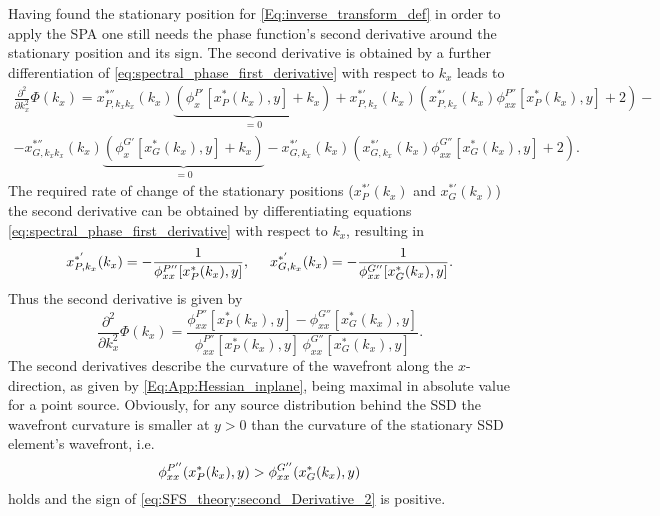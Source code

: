 Having found the stationary position for \eqref{Eq:inverse_transform_def} in order to apply the SPA one still needs the phase function's second derivative around the stationary position and its sign.
The second derivative is obtained by a further differentiation of \eqref{eq:spectral_phase_first_derivative} with respect to $k_x$ leads to
\begin{multline}
\frac{\partial^2}{\partial k_x^2}\Phi(k_x) = 
  x^{*''}_{P,k_x k_x}(k_x) \underbrace{ \left( \phi^{P'}_x[x^*_P(k_x),y]  + k_x \right)}_{ = 0} + 
  x^{*'}_{P,k_x}(k_x) \left( x^{*'}_{P,k_x}(k_x) \phi^{P''}_{xx}[x^*_P(k_x),y]  +2  \right)  -\\
- x^{*''}_{G,k_x k_x}(k_x) \underbrace{ \left( \phi^{G'}_x[x^*_G(k_x),y]  + k_x \right) }_{ = 0} 
- x^{*'}_{G,k_x}(k_x) \left( x^{*'}_{G,k_x}(k_x)  \phi^{G''}_{xx}[x^*_G(k_x),y]  + 2\right).
\end{multline}
The required rate of change of the stationary positions ($x^{*'}_P(k_x)$ and $x^{*'}_G(k_x)$) the second derivative can be obtained by differentiating equations \eqref{eq:spectral_phase_first_derivative} with respect to $k_x$, resulting in
\begin{equation}
x^{*'}_{P,k_x}(k_x) = -\frac{1}{\phi^{P''}_{xx}[x^*_P(k_x),y]}, \hspace{5mm} x^{*'}_{G,k_x}(k_x) = -\frac{1}{\phi^{G''}_{xx}[x^*_G(k_x),y]}.
\end{equation}
Thus the second derivative is given by
\begin{equation}
\label{eq:SFS_theory:second_Derivative_2}
\frac{\partial^2}{\partial k_x^2}\Phi(k_x) = 
\frac{\phi^{P''}_{xx}[x^*_P(k_x),y] - \phi^{G''}_{xx}[x^*_G(k_x),y]}{\phi^{P''}_{xx}[x^*_P(k_x),y] \, \phi^{G''}_{xx}[x^*_G(k_x),y]}.
\end{equation}
The second derivatives describe the curvature of the wavefront along the $x$-direction, as given by \eqref{Eq:App:Hessian_inplane}, being maximal in absolute value for a point source.
Obviously, for any source distribution behind the SSD the wavefront curvature is smaller at $y>0$ than the curvature of the stationary SSD element's wavefront, i.e.
\begin{equation}
\phi^{P''}_{xx}(x^*_P(k_x),y) > \phi^{G''}_{xx}(x^*_G(k_x),y)
\end{equation}
holds and the sign of \eqref{eq:SFS_theory:second_Derivative_2} is positive. 

